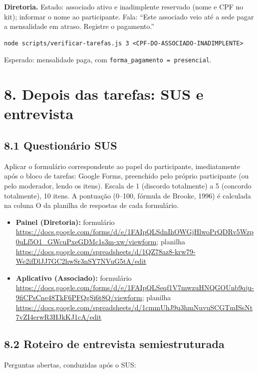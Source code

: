 \documentclass[11pt,a4paper]{article}
\begin{document}
\textbf{Diretoria.} Estado: associado ativo e inadimplente reservado (nome e CPF no kit); informar o
nome ao participante. Fala: ``Este associado veio até a sede pagar a mensalidade em atraso.
Registre o pagamento.''
\begin{verbatim}
node scripts/verificar-tarefas.js 3 <CPF-DO-ASSOCIADO-INADIMPLENTE>
\end{verbatim}
Esperado: mensalidade paga, com \texttt{forma\_pagamento = presencial}.

\section*{8. Depois das tarefas: SUS e entrevista}

\subsection*{8.1 Questionário SUS}

Aplicar o formulário correspondente ao papel do participante, imediatamente após o bloco de
tarefas: Google Forms, preenchido pelo próprio participante (ou pelo moderador, lendo os itens).
Escala de 1 (discordo totalmente) a 5 (concordo totalmente), 10 itens. A pontuação (0--100, fórmula
de Brooke, 1996) é calculada na coluna O da planilha de respostas de cada formulário.

\begin{itemize}[leftmargin=6mm]
  \item \textbf{Painel (Diretoria):} formulário
    \url{https://docs.google.com/forms/d/e/1FAIpQLSdnIhOWGjHlwoPrQDRv5Wzp0uLf5O1_GWcuPxeGDMc1s3m-xw/viewform};
    planilha
    \url{https://docs.google.com/spreadsheets/d/1QZ78az8-krw79-We2ifDlJJ7GC2hwSr3nSY7NVuG5tA/edit}
  \item \textbf{Aplicativo (Associado):} formulário
    \url{https://docs.google.com/forms/d/e/1FAIpQLSeqf1V7mwzuHNQGOUnb9qju-9fiCPsCne48TkF6PFQgSi6t8Q/viewform};
    planilha
    \url{https://docs.google.com/spreadsheets/d/1cmmUhJ9u3hmNuvuSCGTmISsNt7vZI4erwR3HJkKJ1cA/edit}
\end{itemize}

\subsection*{8.2 Roteiro de entrevista semiestruturada}

Perguntas abertas, conduzidas após o SUS:
\end{document}
